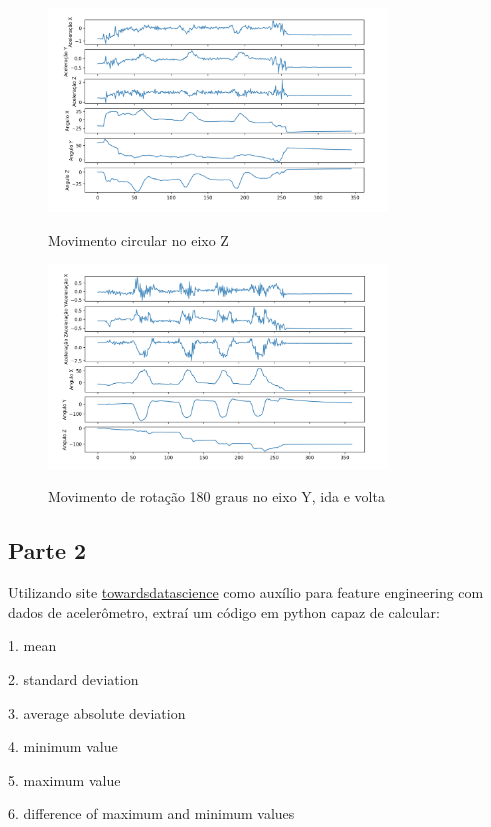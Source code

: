 \begin{figure}[H]
    \center
    \includegraphics[width=9cm]{images/CirculoZ.png}
    \label{img4}
    \caption{Movimento circular no eixo Z}
\end{figure}

\begin{figure}[H]
    \center
    \includegraphics[width=9cm]{images/GiraeVoltaY.png}
    \label{img5}
    \caption{ Movimento de rotação 180 graus no eixo Y, ida e volta }
\end{figure}


\subsection*{Parte 2}

Utilizando site \hyperlink{https://towardsdatascience.com/feature-engineering-on-time-series-data-transforming-signal-data-of-a-smartphone-accelerometer-for-72cbe34b8a60}{towardsdatascience}
como auxílio para feature engineering com dados de acelerômetro, extraí um código em python capaz de calcular:


1. mean

2. standard deviation

3. average absolute deviation

4. minimum value

5. maximum value

6. difference of maximum and minimum values

